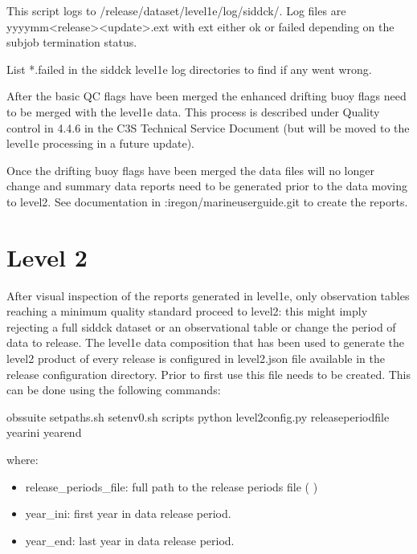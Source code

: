 \documentclass[letterpaper,10pt,english]{sphinxmanual}
\begin{document}
This script logs to /release/dataset/level1e/log/sid\sphinxhyphen{}dck/. Log files
are yyyy\sphinxhyphen{}mm\sphinxhyphen{}\textless{}release\textgreater{}\sphinxhyphen{}\textless{}update\textgreater{}.ext with ext either ok or failed depending on the
subjob termination status.

List  *.failed in the sid\sphinxhyphen{}dck level1e log directories to find if any went wrong.

After the basic QC flags have been merged the enhanced drifting buoy flags need
to be merged with the level1e data. This process is described under Quality
control in 4.4.6 in the C3S Technical Service Document (but will be moved to the level1e
processing in a future update).

Once the drifting buoy flags have been merged the data files will no longer
change and summary data reports need to be generated prior to the data moving to
level2. See documentation in :iregon/marine\sphinxhyphen{}user\sphinxhyphen{}guide.git to
create the reports.


\chapter{Level 2}
\label{\detokenize{index:level-2}}
After visual inspection of the reports generated in level1e, only observation
tables reaching a minimum quality standard proceed to level2: this might imply
rejecting a full sid\sphinxhyphen{}dck dataset or an observational table or change the period
of data to release. The level1e data composition that has been used to generate
the level2 product of every release is configured in level2.json file available
in the release configuration directory. Prior to first use this file needs to be
created. This can be done using the following commands:

\begin{sphinxVerbatim}[commandchars=\\\{\}]
 obs\PYGZhy{}suite
 setpaths.sh
 setenv0.sh
 scripts
python level2\PYGZus{}config.py release\PYGZus{}period\PYGZus{}file year\PYGZus{}ini year\PYGZus{}end
\end{sphinxVerbatim}

where:
\begin{itemize}
\item {}
release\_periods\_file: full path to the release periods file ( {\hyperref[\detokenize{index:release-periods-file}]{}} )

\item {}
year\_ini: first year in data release period.

\item {}
year\_end: last year in data release period.

\end{itemize}
\end{document}
